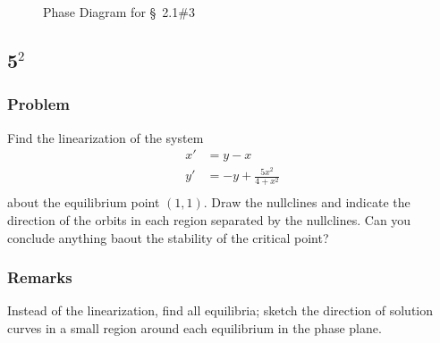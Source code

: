 \documentclass[12pt]{article}
\begin{document}
\begin{figure}
  \centering
  \caption{Phase Diagram for \S~2.1\#3}
  \label{fig:3-phase-diagram}
\end{figure}


\newpage
\subsection{5$^2$}
\subsubsection*{Problem}
Find the linearization of the system
\begin{equation}
  \begin{aligned}
    x'&=y-x \\
    y'&=-y+\frac{5x^2}{4+x^2} \\
  \end{aligned}
\end{equation}
about the equilibrium point $(1,1)$. Draw the nullclines and indicate the
direction of the orbits in each region separated by the nullclines. Can you
conclude anything baout the stability of the critical point?
\subsubsection*{Remarks}
Instead of the linearization, find all equilibria; sketch the direction of
solution curves in a small region around each equilibrium in the phase plane.
\end{document}
